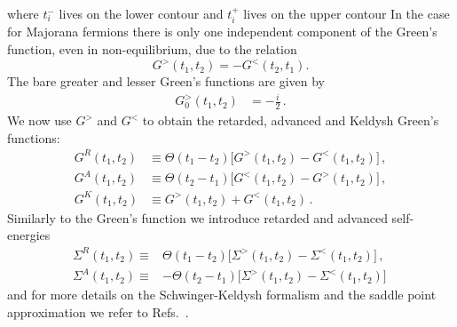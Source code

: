 \documentclass[prx,aps,onecolumn,amsfonts,showpacs,superscriptaddress,preprint,eqsecnum]
{revtex4-1}
\begin{document}
where $t_i^{-}$ lives on the lower contour and $t_i^{+}$ lives on the upper contour
In the case for Majorana fermions there is only one independent component of the Green's 
function, even in non-equilibrium, due to the relation~\cite{Babadi2015}
\begin{equation}
G^{>}(t_{1}, t_{2})=-G^{<}(t_{2}, t_{1}).
\label{eq:majoranacondition}
\end{equation}
The bare greater and lesser Green's functions are given by
\begin{align}
	G^>_0(t_1, t_2) &= -\frac{i}{2}	\,.
\label{eq:G0_gtr_lss}
\end{align}
We now use $G^{>}$ and $G^{<}$ to obtain the retarded, advanced and Keldysh Green's functions: 
\begin{subequations} 
\begin{align}
\label{eq:retarded}	 G^{R}(t_{1},t_{2})&\equiv\Theta(t_{1}-t_{2})\bigl[G^{>}(t_1, t_2) - G^{<}(t_1, 
t_2)\bigr] \, ,
\\
 \label{eq:advanced}
	 G^{A}(t_{1},t_{2})&\equiv \Theta(t_{2}-t_{1})\bigl[G^{<}(t_1, t_2) - G^{>}(t_1, 
t_2)\bigr] \, ,
\\
 \label{eq:keldysh}
	 G^{K}(t_{1},t_{2})&\equiv G^{>}(t_1, t_2)+G^{<}(t_1, t_2) \,.
	\end{align}
\end{subequations}
Similarly to the Green's function we introduce retarded and advanced self-energies
\begin{align}
\Sigma^R(t_1, t_2) \equiv & \Theta(t_1 - t_2) \bigl[\Sigma^>(t_1, t_2) - \Sigma^<(t_1, t_2)\bigr]\, , \label{eq:SERet}\\
\Sigma^A(t_1, t_2) \equiv & -\Theta(t_2 - t_1) \bigl[\Sigma^>(t_1, t_2) - \Sigma^<(t_1, t_2)\bigr] \label{eq:SEAd}\, 
\end{align}
and for more details on the Schwinger-Keldysh formalism and the saddle point approximation
we refer to  Refs.~.
\end{document}
